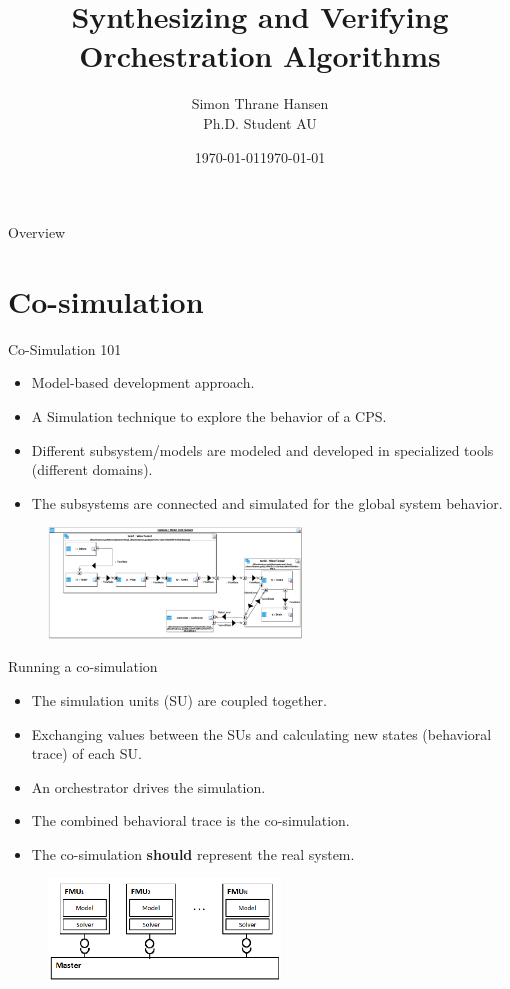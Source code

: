 \documentclass{beamer}
\title[Synthesizing Co-Simulation Algorithms] %
{Synthesizing and Verifying Orchestration Algorithms}
\date{\today}
\author[Thrane, S.] %
{Simon Thrane Hansen \\ Ph.D. Student AU}
\date[AU 2021] %
{\today}
\begin{document}
\frame{\titlepage}

\begin{frame}{Overview}
    \tableofcontents
\end{frame}

\section{Co-simulation}
\begin{frame}{Co-Simulation 101}
    \begin{itemize}
        \item Model-based development approach.
        \item A Simulation technique to explore the behavior of a CPS.
        \item Different subsystem/models are modeled and developed in specialized tools (different domains).
        \item The subsystems are connected and simulated for the global system behavior.
    \end{itemize}
    \begin{figure}    
        \includegraphics[width=0.6\textwidth]{images/co-simulation.png}
    \end{figure}
\end{frame}

\begin{frame}{Running a co-simulation}
    \begin{itemize}
        \item The simulation units (SU) are coupled together.
        \item Exchanging values between the SUs and calculating new states (behavioral trace) of each SU.
        \item An orchestrator drives the simulation.
        \item The combined behavioral trace is the co-simulation.
        \item The co-simulation \textbf{should} represent the real system.
    \end{itemize}
    \begin{figure}    
        \includegraphics[width=0.55\textwidth]{images/master.png}
    \end{figure}
\end{frame}
\end{document}
